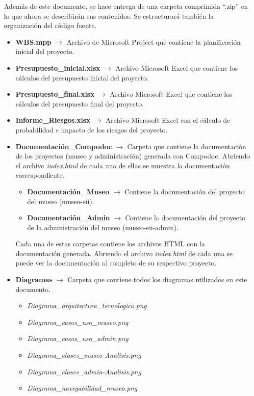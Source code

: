 Además de este documento, se hace entrega de una carpeta comprimida ``.zip'' en la que ahora se describirán sus contenidos. Se estructurará también la organización del código fuente.
\begin{itemize}
	\item \textbf{WBS.mpp} \(\rightarrow\) Archivo de Microsoft Project que contiene la planificación inicial del proyecto.
	\item \textbf{Presupuesto\_inicial.xlsx} \(\rightarrow\) Archivo Microsoft Excel que contiene los cálculos del presupuesto inicial del proyecto.
	\item \textbf{Presupuesto\_final.xlsx} \(\rightarrow\) Archivo Microsoft Excel que contiene los cálculos del presupuesto final del proyecto.
	\item \textbf{Informe\_Riesgos.xlsx} \(\rightarrow\) Archivo Microsoft Excel con el cálculo de probabilidad e impacto de los riesgos del proyecto.
	\item \textbf{Documentación\_Compodoc} \(\rightarrow\) Carpeta que contiene la documentación de los proyectos (museo y administración) generada con Compodoc. Abriendo el archivo \textit{index.html} de cada una de ellas se muestra la documentación correspondiente.
	\begin{itemize}
		\item \textbf{Documentación\_Museo} \(\rightarrow\) Contiene la documentación del proyecto del museo (museo-eii).
		\item \textbf{Documentación\_Admin} \(\rightarrow\) Contiene la documentación del proyecto de la administración del museo (museo-eii-admin).
	\end{itemize}
 	Cada una de estas carpetas contiene los archivos HTML con la documentación generada. Abriendo el archivo \textit{index.html} de cada una se puede ver la documentación al completo de su respectivo proyecto.
	\item \textbf{Diagramas} \(\rightarrow\) Carpeta que contiene todos los diagramas utilizados en este documento.
	\begin{itemize}
		\item \textit{Diagrama\_arquitectura\_tecnologica.png}
		\item \textit{Diagrama\_casos\_uso\_museo.png}
		\item \textit{Diagrama\_casos\_uso\_admin.png}
		\item \textit{Diagrama\_clases\_museo-Analisis.png}
		\item \textit{Diagrama\_clases\_admin-Analisis.png}
		\item \textit{Diagrama\_navegabilidad\_museo.png}

\end{itemize}
\end{itemize}
